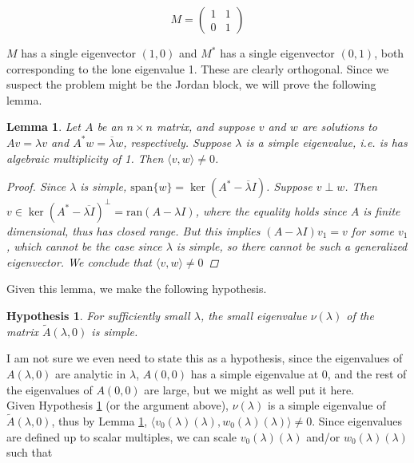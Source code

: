 \documentclass[12pt]{article}
\newtheorem{lemma}{Lemma}
\newtheorem{hypothesis}{Hypothesis}
\begin{document}
\[
M = \begin{pmatrix}1 & 1 \\ 0 & 1 \end{pmatrix}
\]

$M$ has a single eigenvector $(1, 0)$ and $M^*$ has a single eigenvector $(0, 1)$, both corresponding to the lone eigenvalue 1. These are clearly orthogonal. Since we suspect the problem might be the Jordan block, we will prove the following lemma.

\begin{lemma}\label{perpeigs}
Let $A$ be an $n \times n$ matrix, and suppose $v$ and $w$ are solutions to $Av = \lambda v$ and $A^*w = \overline{\lambda}w$, respectively. Suppose $\lambda$ is a simple eigenvalue, i.e. is has algebraic multiplicity of 1. Then $\langle v, w \rangle \neq 0$.
\begin{proof}
Since $\lambda$ is simple, $\text{span} \{w\} = \ker(A^* - \overline{\lambda}I)$. Suppose $v \perp w$. Then $v \in \ker(A^* - \overline{\lambda I})^\perp = \text{ran}(A - \lambda I)$, where the equality holds since $A$ is finite dimensional, thus has closed range. But this implies $(A - \lambda I)v_1 = v$ for some $v_1$, which cannot be the case since $\lambda$ is simple, so there cannot be such a generalized eigenvector. We conclude that $\langle v, w \rangle \neq 0$
\end{proof}
\end{lemma}

Given this lemma, we make the following hypothesis.

\begin{hypothesis}\label{simplesmalleig}
For sufficiently small $\lambda$, the small eigenvalue $\nu(\lambda)$ of the matrix $\tilde{A}(\lambda, 0)$ is simple.
\end{hypothesis}

I am not sure we even need to state this as a hypothesis, since the eigenvalues of $A(\lambda, 0)$ are analytic in $\lambda$, $A(0, 0)$ has a simple eigenvalue at 0, and the rest of the eigenvalues of $A(0, 0)$ are large, but we might as well put it here.\\

Given Hypothesis \ref{simplesmalleig} (or the argument above), $\nu(\lambda)$ is a simple eigenvalue of $\tilde{A}(\lambda, 0)$, thus by Lemma \ref{perpeigs}, $\langle v_0(\lambda)(\lambda), w_0(\lambda)(\lambda) \rangle \neq 0$. Since eigenvalues are defined up to scalar multiples, we can scale $v_0(\lambda)(\lambda)$ and/or $w_0(\lambda)(\lambda)$ such that
\end{document}
